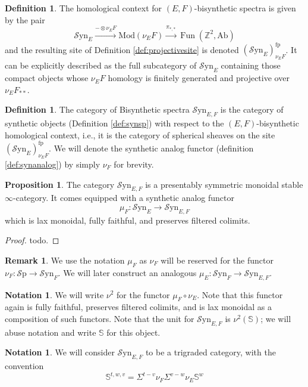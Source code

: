 \documentclass[10pt]{amsart}
\theoremstyle{definition}
\numberwithin{figure}{section}
\numberwithin{equation}{section}
\newtheorem{proposition}[figure]{Proposition}
\newtheorem{definition}[figure]{Definition}
\newtheorem{notation}[figure]{Notation}
\newtheorem{remark}[figure]{Remark}
\theoremstyle{cited}
\newcommand{\bZ}{\mathbb{Z}}
\newcommand{\bS}{\mathbb{S}}
\newcommand{\Fun}{\operatorname{Fun}}
\newcommand{\Ab}{\mathrm{Ab}}
\newcommand{\Sp}{{\mathcal{S}\mathrm{p}}}
\newcommand{\Mod}{\mathrm{Mod}}
\newcommand{\fp}{\mathrm{fp}}
\newcommand{\Syn}{\mathcal{S}\mathrm{yn}}
\begin{document}
\begin{definition}
  The homological context for $(E,F)$-bisynthetic spectra is given by the pair
  \[
  \Syn_{E} \xrightarrow{-\otimes \nu_E F} \Mod(\nu_E F) \xrightarrow{\pi_{*,*}} \Fun(\bZ^2, \Ab)
  \]
  and the resulting site of Definition \ref{def:projectivesite} is denoted $(\Syn_E)_{\nu_E F}^\fp$. It can be explicitly described as the full subcategory of $\Syn_E$ containing those compact objects whose $\nu_E F$ homology is finitely generated and projective over $\nu_E F_{**}$.
\end{definition}

\begin{definition}
  The category of Bisynthetic spectra $\Syn_{E,F}$ is the category of synthetic objects (Definition \ref{def:synsp}) with respect to the $(E,F)$-bisynthetic homological context, i.e., it is the category of spherical sheaves on the site $(\Syn_E)_{\nu_E F}^\fp$. We will denote the synthetic analog functor (definition \ref{def:synanalog}) by simply $\nu_F$ for brevity.
\end{definition}

\begin{proposition}
  The category $\Syn_{E,F}$ is a presentably symmetric monoidal stable $\infty$-category. It comes equipped with a synthetic analog functor
  \[
  \mu_{F}: \Syn_{E}\to \Syn_{E,F}
  \]
  which is lax monoidal, fully faithful, and preserves filtered colimits. 
\end{proposition}

\begin{proof}
  todo.
\end{proof}

\begin{remark}
  We use the notation $\mu_F$ as $\nu_F$ will be reserved for the functor $\nu_F:\Sp \to \Syn_F$. We will later construct an analogous $\mu_E:\Syn_F\to \Syn_{E,F}$. 
\end{remark}

\begin{notation}
  We will write $\nu^2$ for the functor $\mu_F\circ \nu_E$. Note that this functor again is fully faithful, preserves filtered colimits, and is lax monoidal as a composition of such functors. Note that the unit for $\Syn_{E,F}$ is $\nu^2(\bS)$; we will abuse notation and write $\bS$ for this object.
\end{notation}

\begin{notation}
  We will consider $\Syn_{E,F}$ to be a trigraded category, with the convention
  \[
  \bS^{t,w,v}=\Sigma^{t-v}\nu_F\Sigma^{v-w}\nu_E\bS^w
  \]
\end{notation}
\end{document}
